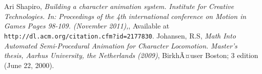 \documentclass[options]{article}
\begin{document}
\begin{thebibliography}{10}  Ari Shapiro, \emph{ Building a character animation system. Institute for Creative Technologies. In: Proceedings of the 4th international conference on Motion in Games Pages 98-109. (November 2011),}, Available at \texttt{ http://dl.acm.org/citation.cfm?id=2177830}.  Johansen, R.S, \emph{Math Into Automated Semi-Procedural Animation for Character Locomotion. Master’s thesis, Aarhus University, the Netherlands (2009)}, BirkhÃ¤user Boston; 3 edition (June 22, 2000). \end{thebibliography}
\end{document}
